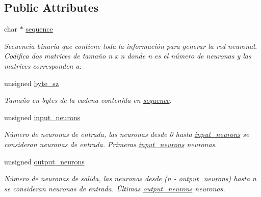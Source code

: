 \subsection*{Public Attributes}
\begin{DoxyCompactItemize}
\item 
char $\ast$ \mbox{\hyperlink{structdna_aed2989af9e06a398429aca34de0d3b3f}{sequence}}
\begin{DoxyCompactList}\small\item\em Secuencia {\itshape binaria} que contiene toda la información para generar la red neuronal. Codifica dos matrices de tamaño n x n donde n es el número de neuronas y las matrices corresponden a\+: \end{DoxyCompactList}\item 
\mbox{\label{structdna_a57e280bcf988165eb8692ecda1967230}} 
unsigned \mbox{\hyperlink{structdna_a57e280bcf988165eb8692ecda1967230}{byte\+\_\+sz}}
\begin{DoxyCompactList}\small\item\em Tamaño en bytes de la cadena contenida en \mbox{\hyperlink{structdna_aed2989af9e06a398429aca34de0d3b3f}{sequence}}. \end{DoxyCompactList}\item 
\mbox{\label{structdna_a8fbd61efb3a087665efb344333c724dc}} 
unsigned \mbox{\hyperlink{structdna_a8fbd61efb3a087665efb344333c724dc}{input\+\_\+neurons}}
\begin{DoxyCompactList}\small\item\em Número de neuronas de entrada, las neuronas desde 0 hasta \mbox{\hyperlink{structdna_a8fbd61efb3a087665efb344333c724dc}{input\+\_\+neurons}} se consideran neuronas de entrada. Primeras \mbox{\hyperlink{structdna_a8fbd61efb3a087665efb344333c724dc}{input\+\_\+neurons}} neuronas. \end{DoxyCompactList}\item 
\mbox{\label{structdna_a8939224e5ff137b49f031dfb649b2068}} 
unsigned \mbox{\hyperlink{structdna_a8939224e5ff137b49f031dfb649b2068}{output\+\_\+neurons}}
\begin{DoxyCompactList}\small\item\em Número de neuronas de salida, las neuronas desde (n -\/ \mbox{\hyperlink{structdna_a8939224e5ff137b49f031dfb649b2068}{output\+\_\+neurons}}) hasta n se consideran neuronas de entrada. Últimas \mbox{\hyperlink{structdna_a8939224e5ff137b49f031dfb649b2068}{output\+\_\+neurons}} neuronas. \end{DoxyCompactList}\end{DoxyCompactItemize}


